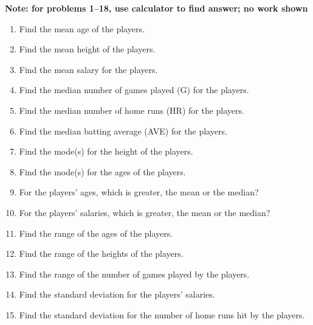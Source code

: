 \begin{center}
\textbf{Note: for problems 1--18, use calculator to find answer; no work shown}
\end{center}

\begin{enumerate}
\item Find the mean age of the players. 

\item Find the mean height of the players. \answer{185.13 cm}

\item Find the mean salary for the players. 

\item Find the median number of games played (G) for the players. 

\item Find the median number of home runs (HR) for the players. 

\item Find the median batting average (AVE) for the players. 

\item Find the mode(s) for the height of the players. \answer{185 cm}

\item Find the mode(s) for the ages of the players. 

\item For the players' ages, which is greater, the mean or the median? 

\item For the players' salaries, which is greater, the mean or the median? 

\item Find the range of the ages of the players. 

\item Find the range of the heights of the players. \answer{20 cm}

\item Find the range of the number of games played by the players. 

\item Find the standard deviation for the players' salaries. 

\item Find the standard deviation for the number of home runs hit by the players. 


\end{enumerate}
